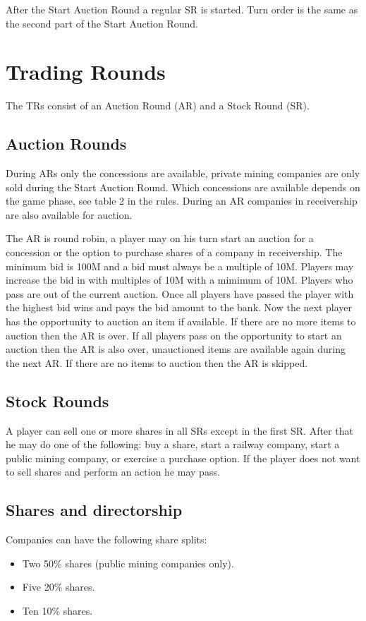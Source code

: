 \documentclass[a4paper,twocolumn]{article}
\begin{document}
After the Start Auction Round a regular SR is started. Turn order is the same
as the second part of the Start Auction Round.

\section{Trading Rounds}
The TRs consist of an Auction Round (AR) and a Stock Round (SR).

\subsection{Auction Rounds}
During ARs only the concessions are available, private mining companies are only
sold during the Start Auction Round. Which concessions are available depends on
the game phase, see table 2 in the rules. During an AR companies in receivership
are also available for auction.

The AR is round robin, a player may on his turn start an auction for a
concession or the option to purchase shares of a company in receivership. The
minimum bid is 100M and a bid must always be a multiple of 10M. Players may
increase the bid in with multiples of 10M with a mimimum of 10M. Players who
pass are out of the current auction. Once all players have passed the player
with the highest bid wins and pays the bid amount to the bank. Now the next
player has the opportunity to auction an item if available. If there are no
more items to auction then the AR is over. If all players pass on the
opportunity to start an auction then the AR is also over, unauctioned items are
available again during the next AR. If there are no items to auction then the
AR is skipped.

\subsection{Stock Rounds}
A player can sell one or more shares in all SRs except in the first SR. After
that he may do one of the following: buy a share, start a railway company, start
a public mining company, or exercise a purchase option. If the player does not
want to sell shares and perform an action he may pass.

\subsection{Shares and directorship}
Companies can have the following share splits:
\begin{itemize}
	\item Two 50\% shares (public mining companies only).
	\item Five 20\% shares.
	\item Ten 10\% shares.
\end{itemize}
\end{document}
